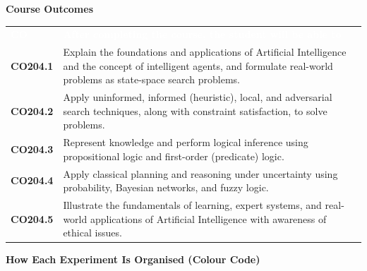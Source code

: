 \documentclass[11pt,a4paper]{article}
\begin{document}
\vspace{8pt}
{\sffamily\bfseries\large\color{navy}Course Outcomes}\par\vspace{2pt}
\begin{tabularx}{\textwidth}{>{\sffamily\bfseries\leavevmode\color{navy}}p{1.9cm}X}
\rowcolor{navy}\textcolor{white}{CO} & \textcolor{white}{\sffamily\bfseries After completing the course, the student will be able to}\\
CO204.1 & Explain the foundations and applications of Artificial Intelligence and the concept of intelligent agents, and formulate real-world problems as state-space search problems.\\
\rowcolor{navy!8} CO204.2 & Apply uninformed, informed (heuristic), local, and adversarial search techniques, along with constraint satisfaction, to solve problems.\\
CO204.3 & Represent knowledge and perform logical inference using propositional logic and first-order (predicate) logic.\\
\rowcolor{navy!8} CO204.4 & Apply classical planning and reasoning under uncertainty using probability, Bayesian networks, and fuzzy logic.\\
CO204.5 & Illustrate the fundamentals of learning, expert systems, and real-world applications of Artificial Intelligence with awareness of ethical issues.\\
\end{tabularx}

\vspace{8pt}
{\sffamily\bfseries\large\color{navy}How Each Experiment Is Organised (Colour Code)}\par\vspace{4pt}
\end{document}
